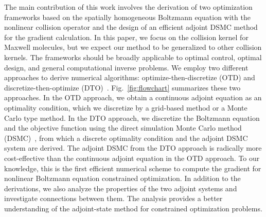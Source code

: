 \documentclass[times,final,nopreprintline]{elsarticle}
\begin{document}
The main contribution of this work involves the derivation of two optimization frameworks based on the spatially homogeneous Boltzmann equation with the nonlinear collision operator and the design of an efficient adjoint DSMC method for the gradient calculation. In this paper, we focus on the collision kernel for Maxwell molecules, but we expect our method to be generalized to other collision kernels. The frameworks should be broadly applicable to optimal control, optimal design, and general computational inverse problems. We employ two different approaches to derive numerical algorithms: optimize-then-discretize (OTD) and discretize-then-optimize (DTO)~\cite{hinze2012discretization}. Fig.~\ref{fig:flowchart} summarizes these two approaches. In the OTD approach, we obtain a continuous adjoint equation as an optimality condition, which we discretize by a grid-based method or a Monte Carlo type method. In the DTO approach, we discretize the Boltzmann equation and the objective function using the direct simulation Monte Carlo method (DSMC)~\cite{bird1970direct,nanbu1980direct,caflisch1998monte}, from which a discrete optimality condition and the adjoint DSMC system are derived. The adjoint DSMC from the DTO approach is radically more cost-effective than the continuous adjoint equation in the OTD approach. To our knowledge, this is the first efficient numerical scheme to compute the gradient for nonlinear Boltzmann equation constrained optimization. In addition to the derivations, we also analyze the properties of the two adjoint systems and investigate connections between them. The analysis provides a better understanding of the adjoint-state method for constrained optimization problems. 
\end{document}
